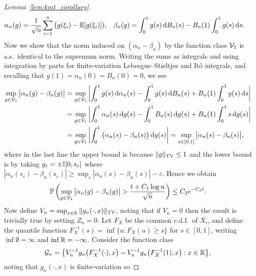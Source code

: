\begin{proof}[Lemma~\ref{lem:kmt_corollary}]
\begin{align*}
    \alpha_n(g)
    &=
    \frac{1}{\sqrt{n}}
    \sum_{i=1}^n
    \big( g(\xi_i) - \mathbb{E}[g(\xi_i)]),
    &\beta_n(g)
    &= \int_0^1 g(s) \,\mathrm{d}B_n(s)
    - B_n(1) \int_0^1 g(s) \,\mathrm{d}s.
  \end{align*}
  Now we show that the norm induced on
  $(\alpha_n - \beta_n)$
  by the function class $\mathcal{V}_1$ is a.s.\ identical to the
  supremum norm.
  Writing the sums as integrals and using integration by parts
  for finite-variation Lebesgue--Stieltjes and It\^o integrals,
  and recalling that $g(1) = \alpha_n(0) = B_n(0) = 0$,
  we see
  \begin{align*}
    \sup_{g \in \mathcal{V}_1}
    \big|\alpha_n(g) - \beta_n(g)\big|
    &=
    \sup_{g \in \mathcal{V}_1}
    \left|
    \int_0^1 g(s) \,\mathrm{d}\alpha_n(s)
    - \int_0^1 g(s) \,\mathrm{d}B_n(s)
    + B_n(1) \int_0^1 g(s) \,\mathrm{d}s
    \right| \\
    &=
    \sup_{g \in \mathcal{V}_1}
    \left|
    \int_0^1 \alpha_n(s) \,\mathrm{d}g(s)
    - \int_0^1 B_n(s) \,\mathrm{d}g(s)
    + B_n(1) \int_0^1 s \,\mathrm{d}g(s)
    \right| \\
    &=
    \sup_{g \in \mathcal{V}_1}
    \left|
    \int_0^1 \big(\alpha_n(s) - \beta_n(s)\big)
    \,\mathrm{d}g(s)
    \right|
    = \sup_{s \in [0,1]}
    \big|
    \alpha_n(s) - \beta_n(s)
    \big|,
  \end{align*}
  where in the last line
  the upper bound is because $\|g\|_{\mathrm{TV}} \leq 1$
  and the lower bound is by taking
  $g_\varepsilon = \pm \mathbb{I}[0,s_\varepsilon]$ where
  $|\alpha_n(s_\varepsilon) - \beta_n(s_\varepsilon)|
  \geq \sup_s |\alpha_n(s) - \beta_n(s)| -
  \varepsilon$.
  Hence we obtain
  \begin{align}
    \label{eq:kmt_concentration}
    \mathbb{P}\left(
      \sup_{g \in \mathcal{V}_1}
      \big|\alpha_n(g) - \beta_n(g)\big|
      > \frac{t + C_1\log n}{\sqrt{n}}
    \right)
    \leq C_2 e^{-C_3 t}.
  \end{align}
  Now define $V_n = \sup_{x \in \mathbb{R}} \|g_n(\cdot, x)\|_{\mathrm{TV}}$,
  noting that if $V_n = 0$ then the result is trivially true
  by setting $Z_n = 0$.
  Let $F_X$ be the common c.d.f.\ of $X_i$,
  and define the quantile function
  $F_X^{-1}(s) = \inf \{u: F_X(u) \geq s\}$ for $s \in [0,1]$,
  writing $\inf \emptyset = \infty$
  and $\inf \mathbb{R} = -\infty$.
  Consider the function class
  \begin{align*}
    \mathcal{G}_n = \big\{
      V_n^{-1} g_n\big(F_X^{-1}(\cdot), x\big)
      - V_n^{-1} g_n\big(F_X^{-1}(1), x\big)
    : x \in \mathbb{R} \big\},
  \end{align*}
  noting that $g_n(\cdot,x)$
  is finite-variation so

\end{proof}

